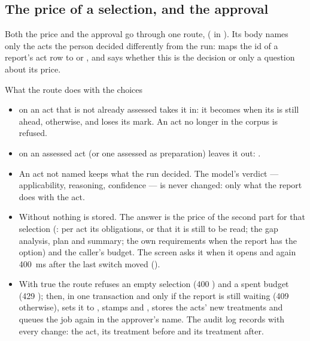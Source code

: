 \subsection{The price of a selection, and the approval}

Both the price and the approval go through one route, 
( in ). Its body names only the acts the person
decided differently from the run:  maps the id of a report's act row to
 or , and  says whether this is the decision or only a
question about its price.

\begin{codebox}{What the route does with the choices}
\begin{itemize}
  \item {} on an act that is not already assessed takes it in: it becomes
     when its  is still ahead,  otherwise, and
    loses its  mark. An act no longer in the corpus is refused.
  \item {} on an assessed act (or one assessed as preparation) leaves it out:
    .
  \item An act not named keeps what the run decided. The model's verdict --- applicability,
    reasoning, confidence --- is never changed: only what the report does with the act.
  \item Without  nothing is stored. The answer is the price of the second part
    for that selection (: per act its obligations, or that it is still to
    be read; the gap analysis, plan and summary; the own requirements when the report has the
    option) and the caller's budget. The screen asks it when it opens and again 400~ms after
    the last switch moved ().
  \item With  true the route refuses an empty selection (400
    ) and a spent budget (429 ); then, in one
    transaction and only if the report is still waiting (409  otherwise),
    sets it to , stamps  and ,
    stores the acts' new treatments and queues the job  again in the
    approver's name. The audit log records  with every change: the
    act, its treatment before and its treatment after.
\end{itemize}
\end{codebox}

